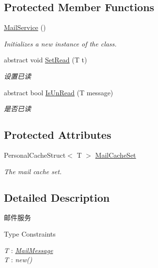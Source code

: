 \subsection*{Protected Member Functions}
\begin{DoxyCompactItemize}
\item 
\mbox{\hyperlink{class_t_net_1_1_message_1_1_mail_service_a1dca54bac3380cfca71c53893be4f529}{Mail\+Service}} ()
\begin{DoxyCompactList}\small\item\em Initializes a new instance of the class. \end{DoxyCompactList}\item 
abstract void \mbox{\hyperlink{class_t_net_1_1_message_1_1_mail_service_af6edeb506a9cb90c2e727f50f33ef161}{Set\+Read}} (T t)
\begin{DoxyCompactList}\small\item\em 设置已读 \end{DoxyCompactList}\item 
abstract bool \mbox{\hyperlink{class_t_net_1_1_message_1_1_mail_service_aba7a5b7bb0a76c846ab5a43e29361c64}{Is\+Un\+Read}} (T message)
\begin{DoxyCompactList}\small\item\em 是否已读 \end{DoxyCompactList}\end{DoxyCompactItemize}
\subsection*{Protected Attributes}
\begin{DoxyCompactItemize}
\item 
Personal\+Cache\+Struct$<$ T $>$ \mbox{\hyperlink{class_t_net_1_1_message_1_1_mail_service_a04a917f7ef30a7d77ff1172fad8d82ed}{Mail\+Cache\+Set}}
\begin{DoxyCompactList}\small\item\em The mail cache set. \end{DoxyCompactList}\end{DoxyCompactItemize}


\subsection{Detailed Description}
邮件服务 

\begin{Desc}
\item[Type Constraints]\begin{description}
\item[{\em T} : {\em \mbox{\hyperlink{class_t_net_1_1_message_1_1_mail_message}{Mail\+Message}}}]\item[{\em T} : {\em new()}]\end{description}
\end{Desc}


